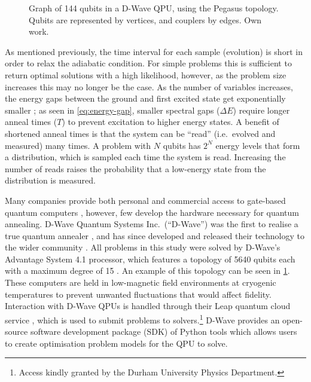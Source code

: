 \documentclass[12pt]{article}
\theoremstyle{definition}
\begin{document}
\begin{figure}[ht]
    \centering
    
    \caption{Graph of \num{144} qubits in a D-Wave QPU, using the Pegasus topology. Qubits are represented by vertices, and couplers by edges. Own work.}
    \label{fig:pegasus}
\end{figure}

As mentioned previously, the time interval for each sample (evolution) is short in order to relax the adiabatic condition. For simple problems this is sufficient to return optimal solutions with a high likelihood, however, as the problem size increases this may no longer be the case. As the number of variables increases, the energy gaps between the ground and first excited state get exponentially smaller \cite{bapst_quantum_2013}; as seen in \cref{eq:energy-gap}, smaller spectral gaps ($\Delta E$) require longer anneal times ($T$) to prevent excitation to higher energy states.
A benefit of shortened anneal times is that the system can be ``read'' (i.e.\ evolved and measured) many times. A problem with $N$ qubits has $2^N$ energy levels that form a distribution, which is sampled each time the system is read. Increasing the number of reads raises the probability that a low-energy state from the distribution is measured.

Many companies provide both personal and commercial access to gate-based quantum computers \cites{google}{ibm}, however, few develop the hardware necessary for quantum annealing. D-Wave Quantum Systems Inc.\ (``D-Wave'') was the first to realise a true quantum annealer \cite{johnson_quantum_2011}, and has since developed and released their technology to the wider community \cite{finley_quantum_2017}. All problems in this study were solved by D-Wave's Advantage System 4.1 processor, which features a topology of \num{5640} qubits each with a maximum degree of \num{15} \cite{dwave_topology}. An example of this topology can be seen in \cref{fig:pegasus}. These computers are held in low-magnetic field environments at cryogenic temperatures to prevent unwanted fluctuations that would affect fidelity.
Interaction with D-Wave QPUs is handled through their Leap quantum cloud service \cite{dwave_leap}, which is used to submit problems to solvers.\footnote{Access kindly granted by the Durham University Physics Department.} D-Wave provides an open-source software development package (SDK) of Python tools which allows users to create optimisation problem models for the QPU to solve.
\end{document}
